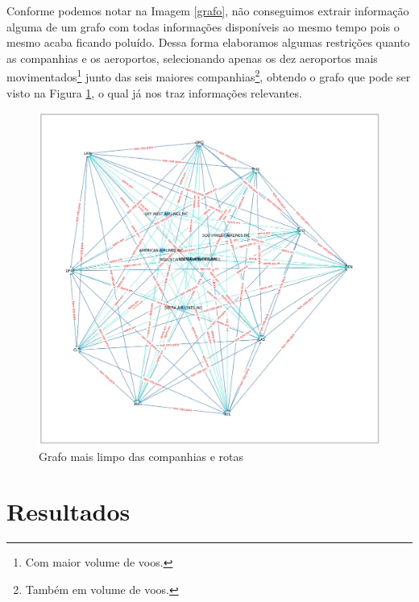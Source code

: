 \documentclass{article}
\begin{document}
Conforme podemos notar na Imagem \ref{grafo}, não conseguimos extrair informação alguma de um grafo com todas informações disponíveis ao mesmo tempo pois o mesmo acaba ficando poluído. Dessa forma elaboramos algumas restrições quanto as companhias e os aeroportos, selecionando apenas os dez aeroportos mais movimentados\footnote{Com maior volume de voos.} junto das seis maiores companhias\footnote{Também em volume de voos.}, obtendo o grafo que pode ser visto na Figura \ref{preview}, o qual já nos traz informações relevantes.
\begin{figure}
    \centering
    \includegraphics[scale = 0.3]{Imagens/preview.png}
    \caption{Grafo mais limpo das companhias e rotas}
    \label{preview}
\end{figure}




\section{Resultados}















\printbibliography
\end{document}
